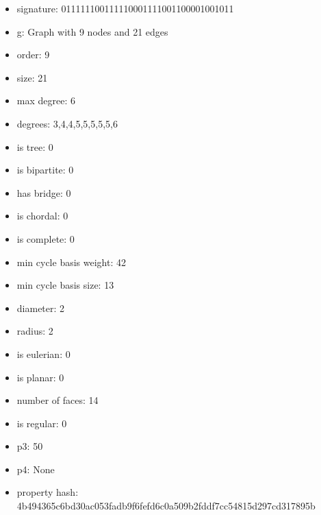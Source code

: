 \newpage
\begin{figure}
\end{figure}
\begin{itemize}
\item signature: 011111100111110001111001100001001011
\item g: Graph with 9 nodes and 21 edges
\item order: 9
\item size: 21
\item max degree: 6
\item degrees: 3,4,4,5,5,5,5,5,6
\item is tree: 0
\item is bipartite: 0
\item has bridge: 0
\item is chordal: 0
\item is complete: 0
\item min cycle basis weight: 42
\item min cycle basis size: 13
\item diameter: 2
\item radius: 2
\item is eulerian: 0
\item is planar: 0
\item number of faces: 14
\item is regular: 0
\item p3: 50
\item p4: None
\item property hash: 4b494365c6bd30ac053fadb9f6fefd6c0a509b2fddf7cc54815d297cd317895b
\end{itemize}
